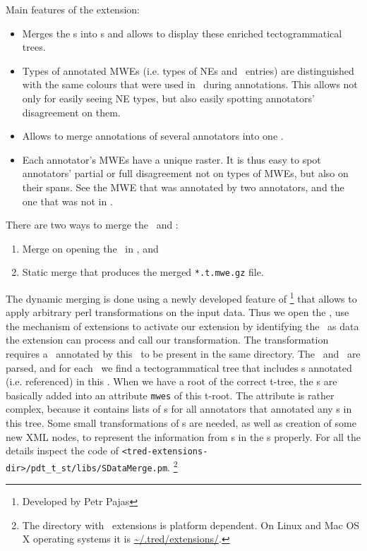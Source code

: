  Main features of the extension:
 \begin{itemize}
\item
Merges the \stf{}s into \tf{}s and allows to display these enriched tectogrammatical trees.
\item
Types of annotated MWEs (i.e. types of NEs and \semlex\ entries) are distinguished with the same colours that were used in \seman\ during annotations. This allows not only for easily seeing NE types, but also easily spotting annotators' disagreement on them. 
\item
Allows to merge annotations of several annotators into one \tf. 
\item
Each annotator's MWEs have a unique raster. It is thus easy to spot annotators' partial or full disagreement not on types of MWEs, but also on their spans. See the MWE that was annotated by two annotators, and the one that was not in .
\end{itemize}

 There are two ways to merge the \sdata\ and \tdata: 
 \begin{enumerate}
\item
Merge on opening the \stf\ in \tred, and
\item
Static merge that produces the merged \verb=*.t.mwe.gz= file. 
\end{enumerate}
The dynamic merging is done using a newly developed feature of \tred\footnote{Developed by Petr Pajas} that allows to apply arbitrary perl transformations on the input data. Thus we open the \stf, use the mechanism of extensions to activate our extension by identifying the \stf\ as data the extension can process and call our transformation. The transformation requires a \tf\ annotated by this \sf\ to be present in the same directory. The \tf\ and \sf\ are parsed, and for each \stn\ we find a tectogrammatical tree that includes \tn{}s annotated (i.e. referenced) in this \stn. When we have a root of the correct t-tree, the \stn{}s are basically added into an attribute \texttt{mwes} of this t-root. The attribute is rather complex, because it contains lists of \stn{}s for all annotators that annotated any \stn{}s in this tree. Some small transformations of \stn{}s are needed, as well as creation of some new XML nodes, to represent the information from \sf{}s in the \tf{}s properly. For all the details inspect the code of \verb=<tred-extensions-dir>/pdt_t_st/libs/SDataMerge.pm=.%
\footnote{The directory with \tred\ extensions is platform dependent. On Linux and Mac OS X operating systems it is \url{~/.tred/extensions/}.}

